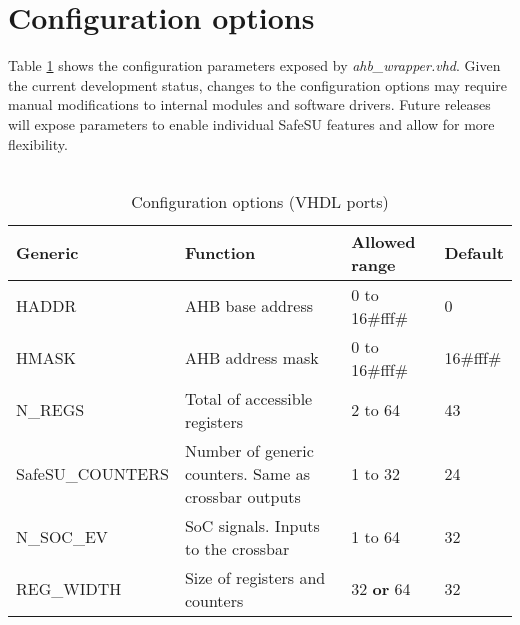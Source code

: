 \section{Configuration options}
\label{chapter 4}
Table \ref{generics} shows the configuration parameters exposed by \textit{ahb\_wrapper.vhd}. Given the current development status, changes to the configuration options may require manual modifications to internal modules and software drivers. Future releases will expose parameters to enable individual SafeSU features and allow for more flexibility.\\
\\
\begin{table}[H]
	\caption{Configuration options (VHDL ports)}
	\label{generics}
	\centering
	\begin{small}
		\begin{tabular}{|l|l|l|l|}
			\hline
			\textbf{Generic} & \textbf{Function}  & \textbf{Allowed range}  & \textbf{Default}\\
			\hline
			HADDR & AHB base address &0 to 16\#fff\# & 0\\
			\hline
			HMASK & AHB address mask &0 to 16\#fff\# & 16\#fff\#\\
			\hline
			N\_REGS & Total of accessible registers & 2 to 64 & 43\\
			\hline
			SafeSU\_COUNTERS & Number of generic counters. Same as crossbar outputs& 1 to 32 &24 \\
			\hline
			N\_SOC\_EV &SoC signals. Inputs to the crossbar& 1 to 64 & 32 \\
			\hline
			REG\_WIDTH &Size of registers and counters & 32 \textbf{or} 64 & 32 \\
			\hline
		
		\end{tabular}
	\end{small}
\end{table}

